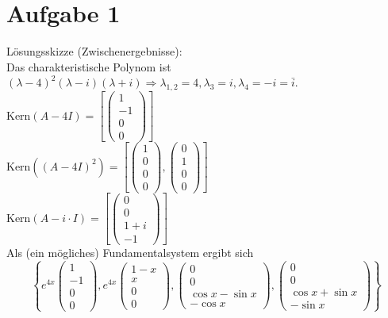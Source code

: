 \documentclass{scrartcl}
\begin{document}
\section*{Aufgabe 1}
Lösungsskizze (Zwischenergebnisse):\\
Das charakteristische Polynom ist $(\lambda-4)^2(\lambda-i)(\lambda+i)\Rightarrow \lambda_{1,2}=4, \lambda_3=i, \lambda_4=-i=\bar{i}$.\\
$\text{Kern}(A-4I)=\left[\begin{pmatrix}1\\-1\\0\\0\end{pmatrix}\right]$\\
$\text{Kern}((A-4I)^2)=\left[\begin{pmatrix}1\\0\\0\\0\end{pmatrix},\begin{pmatrix}0\\1\\0\\0\end{pmatrix}\right]$\\
$\text{Kern}(A-i\cdot I)=\left[\begin{pmatrix}0\\0\\1+i\\-1\end{pmatrix}\right]$\\
Als (ein mögliches) Fundamentalsystem ergibt sich
$$\left\lbrace e^{4x}\begin{pmatrix}1\\-1\\0\\0\end{pmatrix}, e^{4x}\begin{pmatrix}1-x\\x\\0\\0\end{pmatrix},
\begin{pmatrix}0\\0\\ \cos x-\sin x\\-\cos x\end{pmatrix},
\begin{pmatrix}0\\0\\ \cos x+\sin x\\-\sin x\end{pmatrix}\right\rbrace$$
\end{document}
